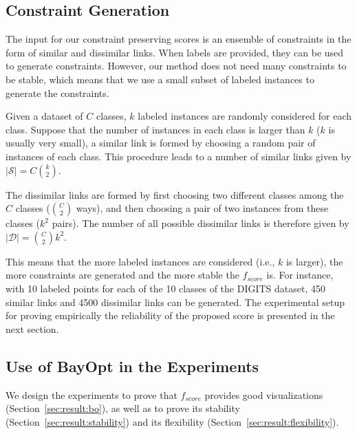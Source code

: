 \subsection{Constraint Generation}\label{sec:xp:constraint}

The input for our constraint preserving scores is an ensemble of constraints in the form of similar and dissimilar links.
When labels are provided, they can be used to generate constraints. However, our method does not need many constraints to be stable, which means that we use a small subset of labeled instances to generate the constraints.

Given a dataset of $C$ classes, $k$ labeled instances are randomly considered for each class.
Suppose that the number of instances in each class is larger than $k$ ($k$ is usually very small),
a similar link is formed by choosing a random pair of instances of each class.
This procedure leads to a number of similar links given by $|\mathcal{S}| = C {k \choose 2}$.

The dissimilar links are formed by first choosing two different classes among the $C$ classes (${C \choose 2}$ ways),
and then choosing a pair of two instances from these classes ($k^2$ pairs).
The number of all possible dissimilar links is therefore given by $|\mathcal{D}| = {C \choose 2} k^2$.

This means that the more labeled instances are considered (i.e., $k$ is larger), the more constraints are generated and the more stable the $f_{score}$ is.
For instance, with 10 labeled points for each of the 10 classes of the DIGITS dataset, 450 similar links and 4500 dissimilar links can be generated.
The experimental setup for proving empirically the reliability of the proposed score is presented in the next section.

\subsection{Use of BayOpt in the Experiments}\label{sec:xp:proof}

We design the experiments to prove that $f_{score}$ provides good visualizations (Section~\ref{sec:result:bo}), as well as to prove its stability (Section~\ref{sec:result:stability}) and its flexibility (Section~\ref{sec:result:flexibility}).

